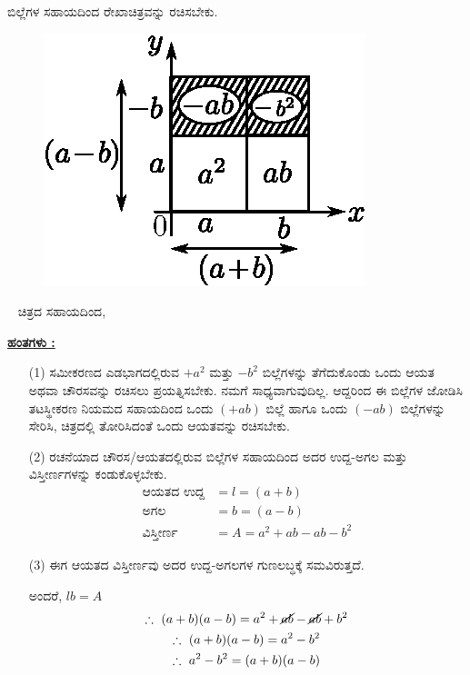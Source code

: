 \begin{enumerate}
ಬಿಲ್ಲೆಗಳ ಸಹಾಯದಿಂದ ರೇಖಾಚಿತ್ರವನ್ನು ರಚಿಸಬೇಕು.
\begin{figure}[H]
\centering
\includegraphics[scale=0.8]{src/figure/chap3/fig3-32e.eps}
\end{figure}
~
\vskip -0.5cm
ಚಿತ್ರದ ಸಹಾಯದಿಂದ,

\noindent
{\textbf{\underline{ಹಂತಗಳು :}}}
\begin{itemize}
\item[(1)] ಸಮೀಕರಣದ ಎಡಭಾಗದಲ್ಲಿರುವ $+a^2$ ಮತ್ತು $-b^2$ ಬಿಲ್ಲೆಗಳನ್ನು ತೆಗೆದುಕೊಂಡು ಒಂದು ಆಯತ ಅಥವಾ ಚೌರಸವನ್ನು ರಚಿಸಲು ಪ್ರಯತ್ನಿಸಬೇಕು. ನಮಗೆ ಸಾಧ್ಯವಾಗುವುದಿಲ್ಲ. ಆದ್ದರಿಂದ ಈ ಬಿಲ್ಲೆಗಳ ಜೋಡಿಸಿ ತಟಸ್ಥೀಕರಣ ನಿಯಮದ ಸಹಾಯದಿಂದ ಒಂದು $(+ab)$ ಬಿಲ್ಲೆ ಹಾಗೂ ಒಂದು $(-ab)$ ಬಿಲ್ಲೆಗಳನ್ನು ಸೇರಿಸಿ, ಚಿತ್ರದಲ್ಲಿ ತೋರಿಸಿದಂತೆ ಒಂದು ಆಯತವನ್ನು ರಚಿಸಬೇಕು. 
\item[(2)] ರಚನೆಯಾದ ಚೌರಸ/ಆಯತದಲ್ಲಿರುವ ಬಿಲ್ಲೆಗಳ ಸಹಾಯದಿಂದ ಅದರ ಉದ್ದ-ಅಗಲ ಮತ್ತು ವಿಸ್ತೀರ್ಣಗಳನ್ನು ಕಂಡುಕೊಳ್ಳಬೇಕು.
\begin{align*}
\text{ಆಯತದ ಉದ್ದ}& = l = (a+b)\\
\text{ಅಗಲ} & = b = (a-b)\\
\text{ವಿಸ್ತೀರ್ಣ} & = A = a^2 + ab - ab - b^2
\end{align*}

\item[(3)] ಈಗ ಆಯತದ ವಿಸ್ತೀರ್ಣವು ಅದರ ಉದ್ದ-ಅಗಲಗಳ ಗುಣಲಬ್ಧಕ್ಕೆ ಸಮವಿರುತ್ತದೆ.

ಅಂದರೆ, $lb = A$
\begin{gather*}
\therefore~ (a+b)(a-b) = a^2 + \cancel{ab} - \cancel{ab} + b^2\\
\therefore~ (a+b)(a-b) = a^2 - b^2\\
\therefore~ a^2 - b^2 = (a+b)(a-b)
\end{gather*}
\end{itemize}



\end{enumerate}
